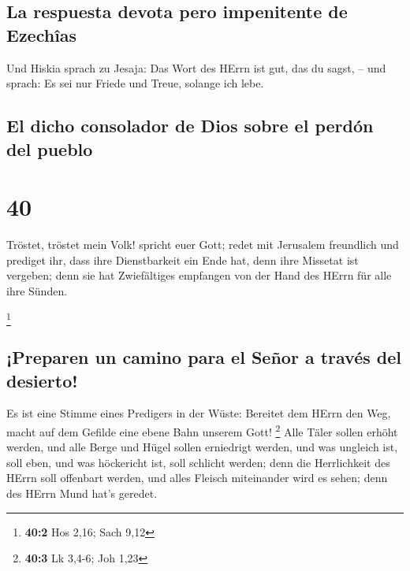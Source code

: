 \hypertarget{la-respuesta-devota-pero-impenitente-de-ezechuxeeas}{%
\subsection{La respuesta devota pero impenitente de
Ezechîas}\label{la-respuesta-devota-pero-impenitente-de-ezechuxeeas}}

 Und Hiskia sprach zu Jesaja: Das Wort des HErrn ist gut,
das du sagst, -- und sprach: Es sei nur Friede und Treue, solange ich
lebe.

\hypertarget{el-dicho-consolador-de-dios-sobre-el-perduxf3n-del-pueblo}{%
\subsection{El dicho consolador de Dios sobre el perdón del
pueblo}\label{el-dicho-consolador-de-dios-sobre-el-perduxf3n-del-pueblo}}

\hypertarget{section-39}{%
\section{40}\label{section-39}}

 Tröstet, tröstet mein Volk! spricht euer Gott;
 redet mit Jerusalem freundlich und prediget ihr, dass
ihre Dienstbarkeit ein Ende hat, denn ihre Missetat ist vergeben; denn
sie hat Zwiefältiges empfangen von der Hand des HErrn für alle ihre
Sünden.

\footnote{\textbf{40:2} Hos 2,16; Sach 9,12}

\hypertarget{preparen-un-camino-para-el-seuxf1or-a-travuxe9s-del-desierto}{%
\subsection{¡Preparen un camino para el Señor a través del
desierto!}\label{preparen-un-camino-para-el-seuxf1or-a-travuxe9s-del-desierto}}

 Es ist eine Stimme eines Predigers in der Wüste: Bereitet
dem HErrn den Weg, macht auf dem Gefilde eine ebene Bahn unserem Gott!
\footnote{\textbf{40:3} Lk 3,4-6; Joh 1,23}  Alle Täler
sollen erhöht werden, und alle Berge und Hügel sollen erniedrigt werden,
und was ungleich ist, soll eben, und was höckericht ist, soll schlicht
werden;  denn die Herrlichkeit des HErrn soll offenbart
werden, und alles Fleisch miteinander wird es sehen; denn des HErrn Mund
hat's geredet.

